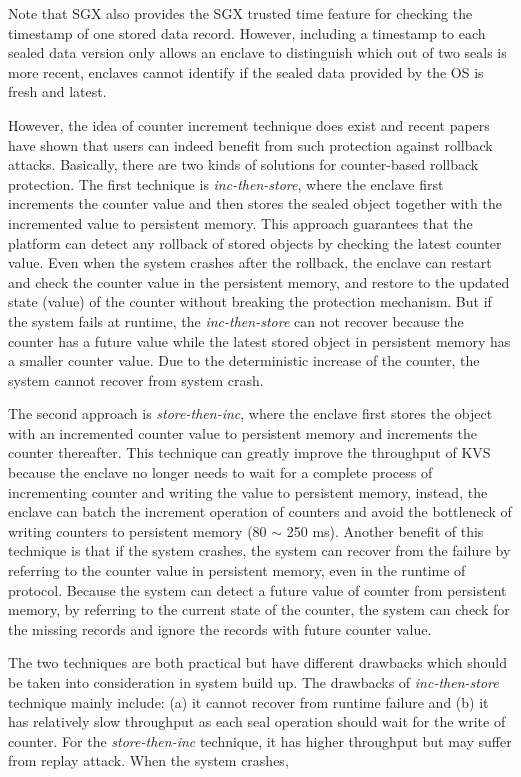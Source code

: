 Note that SGX also provides the SGX trusted time feature for checking the timestamp of one stored data record. However, including a timestamp to each sealed data version only allows an enclave to distinguish which out of two seals is more recent, enclaves cannot identify if the sealed data provided by the OS is fresh and latest.

However, the idea of counter increment technique does exist and recent papers~\cite{} have 
shown that users can indeed benefit from such protection against rollback attacks.
Basically, there are two kinds of solutions for counter-based rollback protection.
The first technique is \textit{inc-then-store}, where the enclave first increments the counter
value and then stores the sealed object together with the incremented value 
to persistent memory. This approach guarantees that the platform can detect any rollback 
of stored objects by checking the latest counter value. Even when the system crashes after 
the rollback, the enclave can restart and check the counter value in the persistent memory,
and restore to the updated state (value) of the counter without breaking the protection mechanism.
But if the system fails at runtime, the \textit{inc-then-store} can not recover because 
the counter has a future value while the latest stored object in persistent memory has a smaller 
counter value. Due to the deterministic increase of the counter, the system cannot recover from 
system crash.

The second approach is \textit{store-then-inc}, where the enclave first stores the object with 
an incremented counter value to persistent memory and increments the counter thereafter.
This technique can greatly improve the throughput of KVS because the enclave no longer needs to 
wait for a complete process of incrementing counter and writing the value to persistent memory,
instead, the enclave can batch the increment operation of counters and avoid the bottleneck 
of writing counters to persistent memory (80 $\sim$ 250 ms). Another benefit of this technique is 
that if the system crashes, the system can recover from the failure by referring to the counter 
value in persistent memory, even in the runtime of protocol. Because the system can detect a future 
value of counter from persistent memory, by referring to the current state of the counter, the 
system can check for the missing records and ignore the records with future counter value.

The two techniques are both practical but have different drawbacks which should be taken into 
consideration in system build up. The drawbacks of \textit{inc-then-store} technique mainly include: 
(a) it cannot recover from runtime failure and (b) it has relatively slow throughput as each seal operation 
should wait for the write of counter. For the \textit{store-then-inc} technique, it has higher throughput 
but may suffer from replay attack. When the system crashes, 
